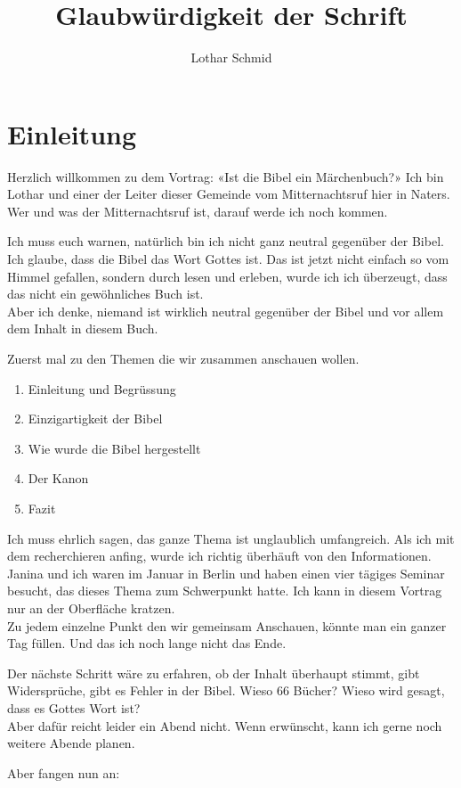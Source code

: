 \documentclass[fontsize=16pt]{mybib}
\title{Glaubwürdigkeit der Schrift}
\author{Lothar Schmid}
\date{}
\begin{document}
\mytitlepage
\tableofcontents
\newpage

\section{Einleitung}
\begin{otsblock}
Herzlich willkommen zu dem Vortrag: «Ist die Bibel ein Märchenbuch?»
Ich bin Lothar und einer der Leiter dieser Gemeinde vom Mitternachtsruf hier in Naters. Wer und was der Mitternachtsruf ist, darauf werde ich noch kommen.

Ich muss euch warnen, natürlich bin ich nicht ganz neutral gegenüber der Bibel. Ich glaube, dass die Bibel das Wort Gottes ist. Das ist jetzt nicht einfach so vom Himmel gefallen, sondern durch lesen und erleben, wurde ich ich überzeugt, dass das nicht ein gewöhnliches Buch ist.\\
Aber ich denke, niemand ist wirklich neutral gegenüber der Bibel und vor allem dem Inhalt in diesem Buch.

Zuerst mal zu den Themen die wir zusammen anschauen wollen. 
\begin{enumerate}
    \item Einleitung und Begrüssung
    \item Einzigartigkeit der Bibel
    \item Wie wurde die Bibel hergestellt
    \item Der Kanon
    \item Fazit
\end{enumerate}

Ich muss ehrlich sagen, das ganze Thema ist unglaublich umfangreich. Als ich mit dem recherchieren anfing, wurde ich richtig überhäuft von den Informationen. Janina und ich waren im Januar in Berlin und haben einen vier tägiges Seminar besucht, das dieses Thema zum Schwerpunkt hatte. Ich kann in diesem Vortrag nur an der Oberfläche kratzen.\\
Zu jedem einzelne Punkt den wir gemeinsam Anschauen, könnte man ein ganzer Tag füllen. Und das ich noch lange nicht das Ende.

Der nächste Schritt wäre zu erfahren, ob der Inhalt überhaupt stimmt, gibt Widersprüche, gibt es Fehler in der Bibel. Wieso 66 Bücher? Wieso wird gesagt, dass es Gottes Wort ist?\\
Aber dafür reicht leider ein Abend nicht. Wenn erwünscht, kann ich gerne noch weitere Abende planen.

Aber fangen nun an:
\end{otsblock}
\end{document}
